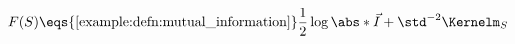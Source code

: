 \begin{examplebox}\nospacing
  \begin{example}\label{example:maximizing_information_gain}
    \begin{align*}
      F(S)\eqs{\text{\cref{example:defn:mutual_information}}}\frac{1}{2}\log\abs*{\vec{I}+\std^{-2}\Kernelm_S}
    \end{align*}
  \end{example}
\end{examplebox}
